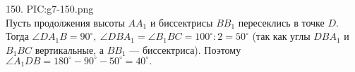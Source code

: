 150. {{PIC:g7-150.png}}\\
Пусть продолжения высоты $AA_1$ и биссектрисы $BB_1$ пересеклись в точке $D.$ Тогда $\angle DA_1B=90^\circ,\ \angle DBA_1=\angle B_1BC=100^\circ:2=50^\circ$ (так как углы $DBA_1$ и $B_1BC$ вертикальные, а $BB_1$ --- биссектриса). Поэтому $\angle A_1DB=180^\circ-90^\circ-50^\circ=40^\circ.$\\
